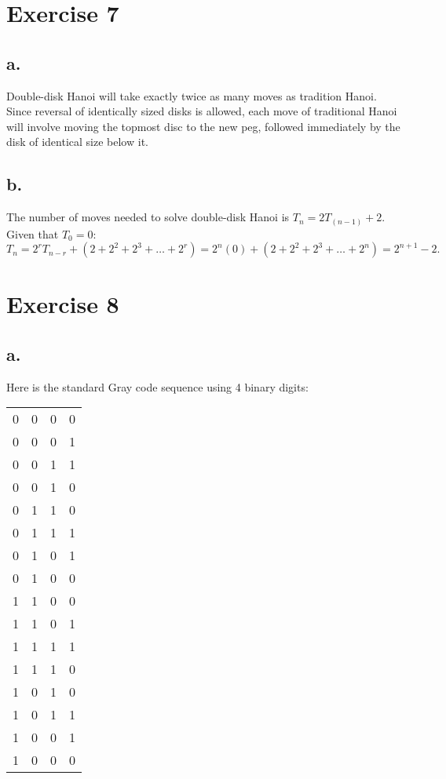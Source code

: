 \documentclass[12pt]{article}
\begin{document}
\section*{Exercise 7}
\subsection*{a.}
Double-disk Hanoi will take exactly twice as many moves as tradition Hanoi.  Since reversal of identically sized disks is allowed, each move of traditional Hanoi will involve moving the topmost disc to the new peg, followed immediately by the disk of identical size below it.
\subsection*{b.}
The number of moves needed to solve double-disk Hanoi is $T_n = 2T_{(n - 1)} + 2$.  Given that $T_0 = 0$:
$$
T_n = 2^rT_{n-r} + (2 + 2^2 + 2^3 + \ldots + 2^r) = 2^n(0) + (2 + 2^2 + 2^3 + \ldots + 2^n) = 2^{n+1} - 2.
$$
\section*{Exercise 8}
\subsection*{a.}
Here is the standard Gray code sequence using 4 binary digits:
\begin{center}
\begin{tabular}{r r r r}
0 & 0 & 0 & 0 \\
0 & 0 & 0 & 1 \\
0 & 0 & 1 & 1 \\
0 & 0 & 1 & 0 \\

0 & 1 & 1 & 0 \\
0 & 1 & 1 & 1 \\
0 & 1 & 0 & 1 \\
0 & 1 & 0 & 0 \\

1 & 1 & 0 & 0 \\
1 & 1 & 0 & 1 \\
1 & 1 & 1 & 1 \\
1 & 1 & 1 & 0 \\

1 & 0 & 1 & 0 \\
1 & 0 & 1 & 1 \\
1 & 0 & 0 & 1 \\
1 & 0 & 0 & 0 \\
\end{tabular}
\end{center}
\end{document}
